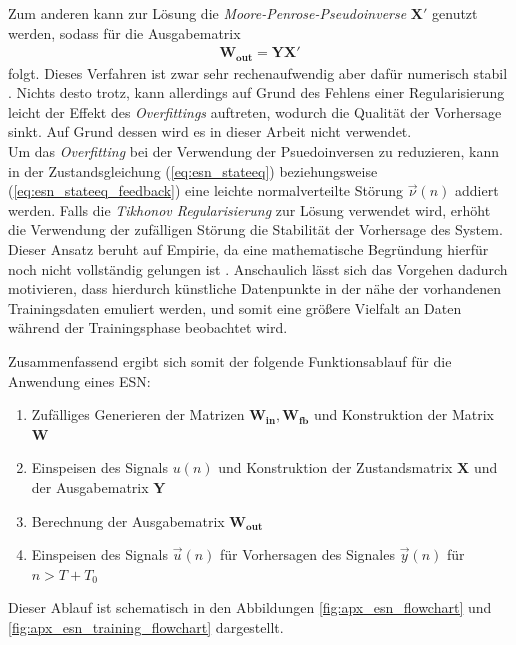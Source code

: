 Zum anderen kann zur Lösung die \textit{Moore-Penrose-Pseudoinverse} $\mathbf{X}'$ genutzt werden, sodass für die Ausgabematrix
\begin{align}
\label{eq:pseudo_inverse}
\mathbf{W_{out}} = \mathbf{Y} \mathbf{X}'
\end{align}
folgt. Dieses Verfahren ist zwar sehr rechenaufwendig aber dafür numerisch stabil \cite{lukoseviciusa2009, jaeger2012}. Nichts desto trotz, kann allerdings auf Grund des Fehlens einer Regularisierung leicht der Effekt des \textit{Overfittings} auftreten, wodurch die Qualität der Vorhersage sinkt. Auf Grund dessen wird es in dieser Arbeit nicht verwendet.\\

Um das \textit{Overfitting} bei der Verwendung der Psuedoinversen zu reduzieren, kann in der Zustandsgleichung (\ref{eq:esn_stateeq}) beziehungsweise (\ref{eq:esn_stateeq_feedback}) eine leichte normalverteilte Störung $\vec{\nu}(n)$ addiert werden. Falls die \textit{Tikhonov Regularisierung} zur Lösung verwendet wird, erhöht die Verwendung der zufälligen Störung die Stabilität der Vorhersage des System. Dieser Ansatz beruht auf Empirie, da eine mathematische Begründung hierfür noch nicht vollständig gelungen ist \citep{jaeger2010, lukoseviciusa2009}. Anschaulich lässt sich das Vorgehen dadurch motivieren, dass hierdurch künstliche Datenpunkte in der nähe der vorhandenen Trainingsdaten emuliert werden, und somit eine größere Vielfalt an Daten während der Trainingsphase beobachtet wird.\\

\begin{minipage}{\textwidth}
Zusammenfassend ergibt sich somit der folgende Funktionsablauf für die Anwendung eines \textsc{ESN}:

\singlespacing
\begin{enumerate}
	\item Zufälliges Generieren der Matrizen $\mathbf{W_{in}}, \mathbf{W_{fb}}$ und Konstruktion der Matrix $\mathbf{W}$ 
	\item Einspeisen des Signals $u(n)$ und Konstruktion der Zustandsmatrix $\mathbf{X}$ und der Ausgabematrix $\mathbf{Y}$ 
	\item Berechnung der Ausgabematrix $\mathbf{W_{out}}$
	\item Einspeisen des Signals $\vec{u}(n)$ für Vorhersagen des Signales $\vec{y}(n)$ für $n > T + T_0$
\end{enumerate}
\onehalfspacing
\end{minipage}

Dieser Ablauf ist schematisch in den Abbildungen \ref{fig:apx_esn_flowchart} und \ref{fig:apx_esn_training_flowchart} dargestellt.

